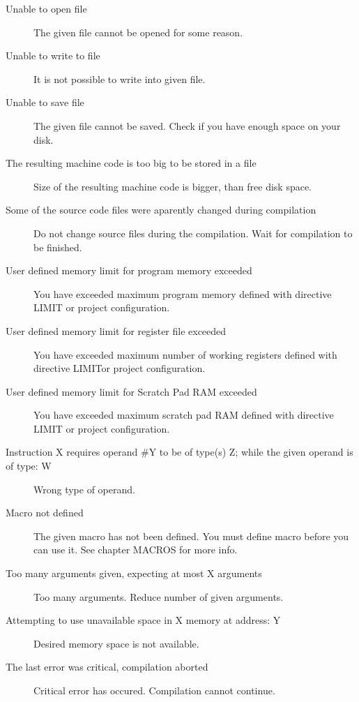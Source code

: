         \begin{description}
            \item[Unable to open file]
                The given file cannot be opened for some reason.
            \item[Unable to write to file]
                It is not possible to write into given file.
            \item[Unable to save file]
                The given file cannot be saved. Check if you have enough space on your disk.
            \item[The resulting machine code is too big to be stored in a file]
                Size of the resulting machine code is bigger, than free disk space.
            \item[Some of the source code files were aparently changed during compilation]
                Do not change source files during the compilation. Wait for compilation to be finished.
            \item[User defined memory limit for program memory exceeded]
                You have exceeded maximum program memory defined with directive LIMIT or project configuration.
            \item[User defined memory limit for register file exceeded]
                You have exceeded maximum number of working registers defined with directive LIMITor project configuration.
            \item[User defined memory limit for Scratch Pad RAM exceeded]
                You have exceeded maximum scratch pad RAM defined with directive LIMIT or project configuration.
            \item[Instruction X requires operand \#Y to be of type(s) Z; while the given operand is of type: W]
                Wrong type of operand.
            \item[Macro not defined ]
                The given macro has not been defined. You must define macro before you can use it. See chapter MACROS for more info.
            \item[Too many arguments given, expecting at most X arguments]
                Too many arguments. Reduce number of given arguments.
            \item[Attempting to use unavailable space in X memory at address: Y ]
                Desired memory space is not available.
            \item[The last error was critical, compilation aborted]
                Critical error has occured. Compilation cannot continue.

\end{description}
